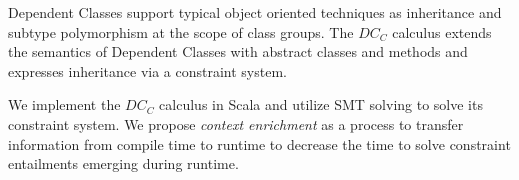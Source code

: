 Dependent Classes support typical
object oriented techniques
as inheritance and subtype polymorphism
at the scope of class groups.
The $DC_C$ calculus extends the semantics
of Dependent Classes with
abstract classes and methods
and expresses inheritance via a constraint system.

We implement the $DC_C$ calculus in Scala
and utilize SMT solving to solve its constraint system.
We propose \textit{context enrichment} as a process
to transfer information from compile time to runtime
to decrease the time to solve constraint entailments emerging during runtime.


